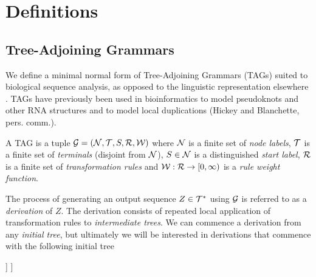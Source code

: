 \documentclass[10pt]{article}
\begin{document}
\section{Definitions}

\subsection{Tree-Adjoining Grammars}

We define a minimal normal form of Tree-Adjoining Grammars (TAGs)
suited to biological sequence analysis,
as opposed to the linguistic representation elsewhere \cite{JoshiSchabes97}.
TAGs have previously been used in bioinformatics
to model pseudoknots and other RNA structures \cite{MatsuiEtAl2005,ChiangJoshiSearls2006}
and to model local duplications (Hickey and Blanchette, pers. comm.).

\newcommand\grammar{{\cal G}}
\newcommand\nodelabels{{\cal N}}
\newcommand\terminals{{\cal T}}
\newcommand\startsymbol{S}
\newcommand\rules{{\cal R}}
\newcommand\weight{{\cal W}}

A TAG is a tuple $\grammar=(\nodelabels,\terminals,\startsymbol,\rules,\weight)$ where
$\nodelabels$ is a finite set of {\em node labels},
$\terminals$ is a finite set of {\em terminals} (disjoint from $\nodelabels$),
$\startsymbol \in \nodelabels$ is a distinguished {\em start label},
$\rules$ is a finite set of {\em transformation rules}
and $\weight:\rules \to [0,\infty)$ is a {\em rule weight function}.

\newcommand\outseq{Z}
\newcommand\outsubseq[2]{\outseq[#1 \ldots #2]}

The process of generating an output sequence $\outseq \in \terminals^\ast$ using $\grammar$
is referred to as a {\em derivation} of $\outseq$.
The derivation consists of repeated local application of transformation rules to {\em intermediate trees}.
We can commence a derivation from any {\em initial tree}, but ultimately we will be interested in derivations that commence with the following initial tree

\newcommand\lineartree[3]{\Tree[ .$#1$ [ .$#2$ [ .$#3$ ] ] ]}
\newcommand\inittree[1]{\lineartree{\epsilon}{#1}{\epsilon}}

\inittree{\startsymbol}

\newcommand\rulesubset[2]{\rules_{#1}(#2)}


\newcommand\abtree[1]{\lineartree{\alpha}{#1}{\beta}}
\newcommand\lhs{\abtree{A}}

\end{document}
